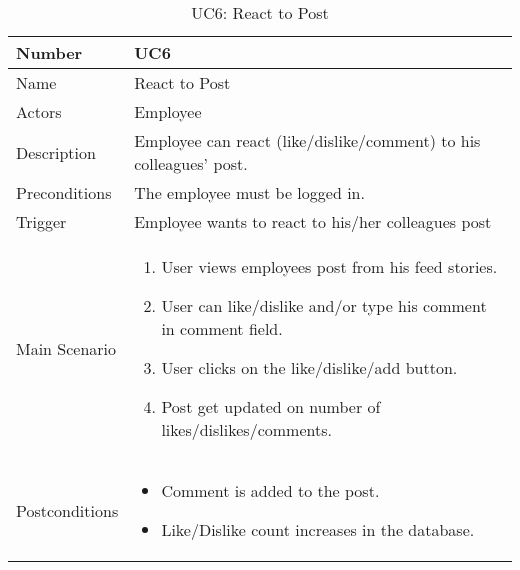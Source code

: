 \documentclass[12pt,a4paper]{article}
\begin{document}
\begin{table}[h]
\centering
\caption{UC6: React to Post}
\label{tab:uc6}
\begin{tabularx}{\textwidth}{@{}lX@{}}
\toprule

Number & UC6 \\ \midrule
Name & React to Post \\
Actors & Employee\\
Description & Employee can react (like/dislike/comment) to his colleagues’ post.
 \\
Preconditions & The employee must be logged in. \\
Trigger & Employee wants to react to his/her colleagues post\\
Main Scenario & 
\begin{enumerate}
\item User views employees post from his feed stories.
\item User can like/dislike and/or type his comment in comment field.
\item User clicks on the like/dislike/add button.
\item Post get updated on number of likes/dislikes/comments.
\end{enumerate}
 \\
Postconditions & 
\begin{itemize}
\item Comment is added to the post.
\item Like/Dislike count increases in the database.
\end{itemize}
 \\
\bottomrule
\end{tabularx}
\end{table}
\end{document}
